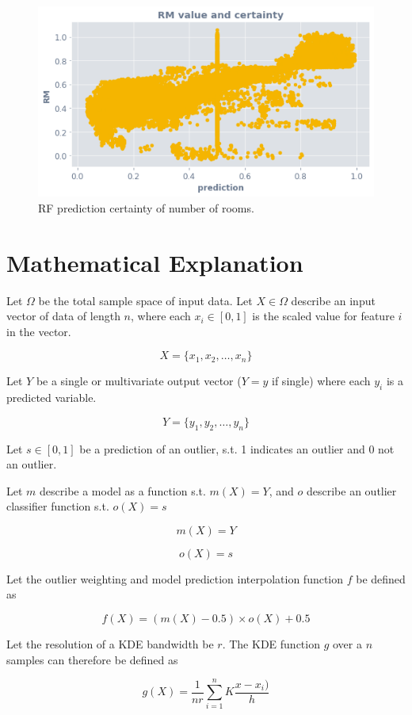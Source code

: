 \documentclass[a4paperpaper,twocolumn]{article}
\begin{document}
\begin{figure}
\centering
\includegraphics[width=\columnwidth]{img/reg_rf_ocsvm_rm.png}
\caption{RF prediction certainty of number of rooms.}
\label{fig:reg-rf-ocsvm-rm}
\end{figure}

\section{Mathematical Explanation}

Let $\Omega$ be the total sample space of input data. Let $X \in \Omega$ describe an input vector of data of length $n$, where each $x_i \in [0, 1]$ is the scaled value for feature $i$ in the vector.

$$X = \{x_1, x_2, \ldots, x_n\}$$

Let $Y$ be a single or multivariate output vector ($Y = y$ if single) where each $y_i$ is a predicted variable.

$$Y = \{y_1, y_2, \ldots, y_n\}$$

Let $s \in [0, 1]$ be a prediction of an outlier, s.t. 1 indicates an outlier and 0 not an outlier.

Let $m$ describe a model as a function s.t. $m(X) = Y$, and $o$ describe an outlier classifier function s.t. $o(X) = s$

$$m(X) = Y$$

$$o(X) = s$$

Let the outlier weighting and model prediction interpolation function $f$ be defined as

$$f(X) = (m(X) - 0.5) \times o(X) + 0.5$$

Let the resolution of a KDE bandwidth be $r$. The KDE function $g$ over a $n$ samples can therefore be defined as

$$g(X) = \frac{1}{nr} \sum^n_{i=1} K \frac{x - x_i)}{h}$$
\end{document}
